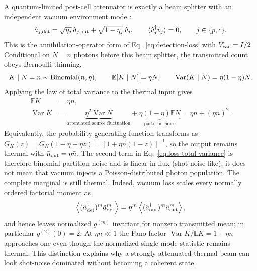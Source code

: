 \documentclass[11pt,a4paper]{article}
\begin{document}
A quantum-limited post-cell attenuator is exactly a beam splitter with an
independent vacuum environment mode \cite{Ivan2011,Lami2020}:
\begin{equation}
 \hat a_{j,{\rm det}}=\sqrt{\eta_j}\,\hat a_{j,{\rm out}}
 +\sqrt{1-\eta_j}\,\hat v_j,
 \qquad \langle\hat v_j^\dagger\hat v_j\rangle=0,\qquad j\in\{p,c\}.
 \label{eq:pure-loss-operator}
\end{equation}
This is the annihilation-operator form of Eq.~\eqref{eq:detection-loss} with
$V_{\rm vac}=I/2$.  Conditional on $N=n$ photons before this beam splitter,
the transmitted count obeys Bernoulli thinning,
\begin{equation}
 K\mid N=n\sim {\rm Binomial}(n,\eta),
 \qquad
 \mathbb E[K\mid N]=\eta N,\qquad
 \operatorname{Var}(K\mid N)=\eta(1-\eta)N .
 \label{eq:loss-thinning}
\end{equation}
Applying the law of total variance to the thermal input gives
\begin{align}
 \mathbb E K&=\eta\bar n,\nonumber\\
 \operatorname{Var}K
 &=\underbrace{\eta^2\operatorname{Var}N}_{\text{attenuated source fluctuation}}
  +\underbrace{\eta(1-\eta)\mathbb E N}_{\text{partition noise}}
  =\eta\bar n+(\eta\bar n)^2 .
 \label{eq:loss-total-variance}
\end{align}
Equivalently, the probability-generating function transforms as
$G_K(z)=G_N(1-\eta+\eta z)=[1+\eta\bar n(1-z)]^{-1}$, so the output remains
thermal with $\bar n_{\rm out}=\eta\bar n$.  The second term in
Eq.~\eqref{eq:loss-total-variance} is therefore binomial partition noise and is
linear in flux (shot-noise-like); it does not mean that vacuum injects a
Poisson-distributed photon population.  The complete marginal is still
thermal.  Indeed, vacuum loss scales every normally ordered factorial moment
as
\begin{equation}
 \left\langle(\hat a_{\rm det}^\dagger)^m
 \hat a_{\rm det}^m\right\rangle
 =\eta^m\left\langle(\hat a_{\rm out}^\dagger)^m
 \hat a_{\rm out}^m\right\rangle ,
\end{equation}
and hence leaves normalized $g^{(m)}$ invariant for nonzero transmitted mean;
in particular $g^{(2)}(0)=2$.  At $\eta\bar n\ll1$ the Fano factor
$\operatorname{Var}K/\mathbb E K=1+\eta\bar n$ approaches one even though the normalized
single-mode statistic remains thermal.  This distinction explains why a
strongly attenuated thermal beam can look shot-noise dominated without becoming
a coherent state.
\end{document}
